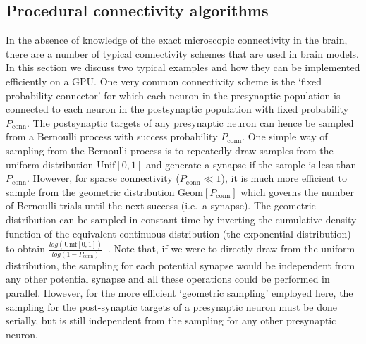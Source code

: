 \documentclass[9pt,a4paper]{amsart}
\begin{document}
\subsection{Procedural connectivity algorithms}
\label{sec:methods/procedural_connectivity}
In the absence of knowledge of the exact microscopic connectivity in the brain, there are a number of typical connectivity schemes that are used in brain models.
In this section we discuss two typical examples and how they can be implemented efficiently on a GPU.
One very common connectivity scheme is the `fixed probability connector' for which each neuron in the presynaptic population is connected to each neuron in the postsynaptic population with fixed probability $P_{\text{conn}}$.
The postsynaptic targets of any presynaptic neuron can hence be sampled from a Bernoulli process with success probability $P_{\text{conn}}$.
One simple way of sampling from the Bernoulli process is to repeatedly draw samples from the uniform distribution $\text{Unif}[0, 1]$ and generate a synapse if the sample is less than $P_{\text{conn}}$.
However, for sparse connectivity ($P_{\text{conn}} \ll 1$), it is much more efficient to sample from the geometric distribution $\text{Geom}[P_{\text{conn}}]$ which governs the number of Bernoulli trials until the next success (i.e.~a synapse).
The geometric distribution can be sampled in constant time by inverting the cumulative density function of the equivalent continuous distribution (the exponential distribution) to obtain $\frac{log(\text{Unif}[0, 1])}{log(1 - P_{\text{conn}})}$~\citep[p499]{DevroyeLuc2013}.
Note that, if we were to directly draw from the uniform distribution, the sampling for each potential synapse would be independent from any other potential synapse and all these operations could be performed in parallel.
However, for the more efficient `geometric sampling' employed here, the sampling for the post-synaptic targets of a presynaptic neuron must be done serially, but is still independent from the sampling for any other presynaptic neuron.
\end{document}
